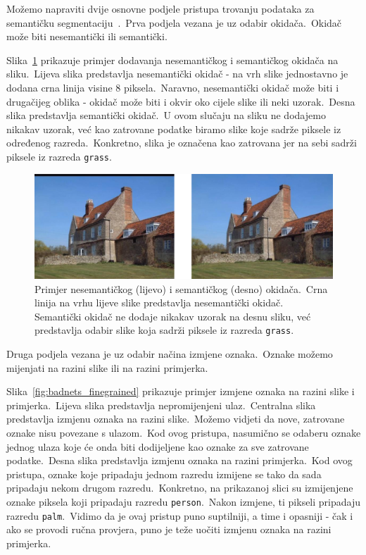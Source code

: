 \documentclass[times, utf8, seminar, numeric]{fer}
\begin{document}
Možemo napraviti dvije osnovne podjele pristupa trovanju podataka za semantičku segmentaciju~\cite{li2021hidden}.\ 
Prva podjela vezana je uz odabir okidača.\ Okidač može biti nesemantički ili semantički.\ 
  
Slika~\ref{fig:nonsemantic_semantic} prikazuje primjer dodavanja nesemantičkog i semantičkog okidača na sliku.\ 
Lijeva slika predstavlja nesemantički okidač - na vrh slike jednostavno je dodana crna linija visine 8 piksela.\ 
Naravno, nesemantički okidač može biti i drugačijeg oblika - okidač može biti i okvir oko cijele slike ili neki uzorak.\
Desna slika predstavlja semantički okidač.\ U ovom slučaju na sliku ne dodajemo nikakav uzorak, već kao zatrovane podatke biramo slike koje sadrže piksele iz određenog razreda.\ 
Konkretno, slika je označena kao zatrovana jer na sebi sadrži piksele iz razreda \texttt{grass}.\ 

\pagebreak

\begin{figure}[h]
    \centering
    \includegraphics[scale=0.4]{./Slike/nonsemantic_semantic.png}
    \caption{Primjer nesemantičkog (lijevo) i semantičkog (desno) okidača.\ Crna linija na vrhu lijeve slike predstavlja nesemantički okidač. Semantički okidač ne dodaje nikakav uzorak na desnu sliku, već predstavlja odabir slike koja sadrži piksele iz razreda \texttt{grass}.}
    \label{fig:nonsemantic_semantic}
\end{figure}

Druga podjela vezana je uz odabir načina izmjene oznaka.\ Oznake možemo mijenjati na razini slike ili na razini primjerka.\ 
  
Slika~\ref{fig:badnets_finegrained} prikazuje primjer izmjene oznaka na razini slike i primjerka.\
Lijeva slika predstavlja nepromijenjeni ulaz.\ Centralna slika predstavlja izmjenu oznaka na razini slike.\ 
Možemo vidjeti da nove, zatrovane oznake nisu povezane s ulazom.\ Kod ovog pristupa, nasumično se odaberu oznake jednog ulaza koje će onda biti dodijeljene kao oznake za sve zatrovane podatke.\
Desna slika predstavlja izmjenu oznaka na razini primjerka.\ Kod ovog pristupa, oznake koje pripadaju jednom razredu izmijene se tako da sada pripadaju nekom drugom razredu.\ 
Konkretno, na prikazanoj slici su izmijenjene oznake piksela koji pripadaju razredu \texttt{person}.\ Nakon izmjene, ti pikseli pripadaju razredu \texttt{palm}.\
Vidimo da je ovaj pristup puno suptilniji, a time i opasniji - čak i ako se provodi ručna provjera, puno je teže uočiti izmjenu oznaka na razini primjerka.\
\end{document}
